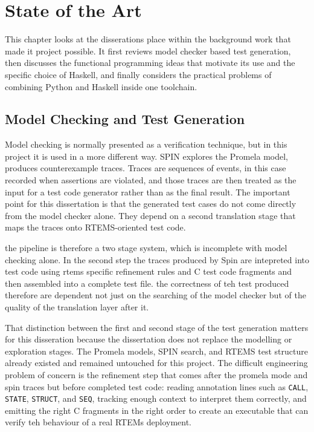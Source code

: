\chapter{State of the Art}
\label{chap:StateOfTheArt}


This chapter looks at the disserations place within the background work that made it project possible. It first reviews model checker based test generation, then discusses the functional programming ideas that motivate its use and the specific choice of Haskell, and finally considers the practical problems of combining Python and Haskell inside one toolchain.

\section{Model Checking and Test Generation}

Model checking is normally presented as a verification technique, but in this project it is used in a more different way. SPIN explores the Promela model, produces counterexample traces. Traces are sequences of events, in this case recorded when assertions are violated, and those traces are then treated as the input for a test code generator rather than as the final result. The important point for this dissertation is that the generated test cases do not come directly from the model checker alone. They depend on a second translation stage that maps the traces onto RTEMS-oriented test code.

the pipeline is therefore a two stage system, which is incomplete with model checking alone. In the second step the traces produced by Spin are intepreted into test code using rtems specific refinement rules and C test code fragments and then assembled into a complete test file. the correctness of teh test produced therefore are dependent not just on the searching of the model checker but of the quality of the translation layer after it. 

That distinction between the first and second stage of the test generation matters for this disseration because the dissertation does not replace the modelling or exploration stages. The Promela models, SPIN search, and RTEMS test structure already existed and remained untouched for this project. The difficult engineering problem of concern is the refinement step that comes after the promela mode and spin traces but before completed test code: reading annotation lines such as \texttt{CALL}, \texttt{STATE}, \texttt{STRUCT}, and \texttt{SEQ}, tracking enough context to interpret them correctly, and emitting the right C fragments in the right order to create an executable that can verify teh behaviour of a real RTEMs deployment.

